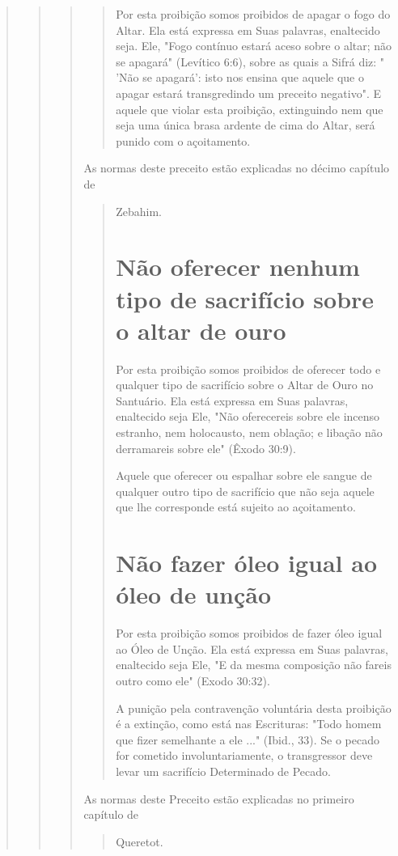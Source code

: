 \begin{quote}
\begin{quote}
\begin{quote}
\begin{quote}
Por esta proibição somos proibidos de apagar o fogo do Altar. Ela está
expressa em Suas palavras, enaltecido seja. Ele, "Fogo contínuo estará
ace­so sobre o altar; não se apagará" (Levítico 6:6), sobre as quais a
Sifrá diz: " 'Não se apagará': isto nos ensina que aquele que o apagar
estará transgredindo um preceito negativo". E aquele que violar esta
proibição, extinguindo nem que seja uma única brasa ardente de cima do
Altar, será punido com o açoitamento.
\end{quote}

As normas deste preceito estão explicadas no décimo capítulo de

\begin{quote}
Zebahim.

\section{Não oferecer nenhum tipo de sacrifício sobre o altar de ouro}

Por esta proibição somos proibidos de oferecer todo e qualquer ti­po de
sacrifício sobre o Altar de Ouro no Santuário. Ela está expressa em Suas
palavras, enaltecido seja Ele, "Não oferecereis sobre ele incenso
estranho, nem holocausto, nem oblação; e libação não derramareis sobre
ele" (Êxodo 30:9).

Aquele que oferecer ou espalhar sobre ele sangue de qualquer outro tipo
de sacrifício que não seja aquele que lhe corresponde está sujeito ao
açoitamento.

\section{Não fazer óleo igual ao óleo de unção}

Por esta proibição somos proibidos de fazer óleo igual ao Óleo de Unção.
Ela está expressa em Suas palavras, enaltecido seja Ele, "E da mesma
composição não fareis outro como ele" (Exodo 30:32).

A punição pela contravenção voluntária desta proibição é a extin­ção,
como está nas Escrituras: "Todo homem que fizer semelhante a ele ..."
(Ibid., 33). Se o pecado for cometido involuntariamente, o transgressor
deve levar um sacrifício Determinado de Pecado.
\end{quote}

As normas deste Preceito estão explicadas no primeiro capítulo de

\begin{quote}
Queretot.



\end{quote}
\end{quote}
\end{quote}
\end{quote}
